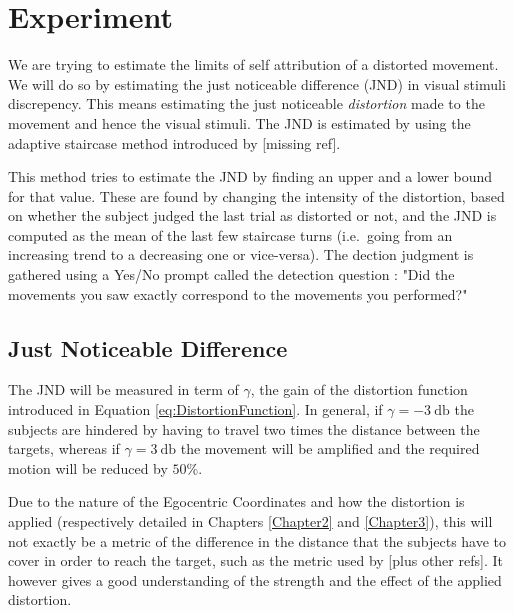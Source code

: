 
\chapter{Experiment} %

\label{Chapter4} %

We are trying to estimate the limits of self attribution of a distorted movement. We will do so by estimating the just noticeable difference (JND) in visual stimuli discrepency. This means estimating the just noticeable \textit{distortion} made to the movement and hence the visual stimuli. The JND is estimated by using the adaptive staircase method introduced by [missing ref].

This method tries to estimate the JND by finding an upper and a lower bound for that value. These are found by changing the intensity of the distortion, based on whether the subject judged the last trial as distorted or not, and the JND is computed as the mean of the last few staircase turns (i.e.\ going from an increasing trend to a decreasing one or vice-versa). The dection judgment is gathered using a Yes/No prompt called the detection question : "Did the movements you saw exactly correspond to the movements you performed?"

\section{Just Noticeable Difference}

The JND will be measured in term of $\gamma$, the gain of the distortion function introduced in Equation \ref{eq:DistortionFunction}. In general, if $\gamma = \SI{-3}{\decibel}$ the subjects are hindered by having to travel two times the distance between the targets, whereas if $\gamma = \SI{3}{\decibel}$ the movement will be amplified and the required motion will be reduced by $50\%$.

Due to the nature of the Egocentric Coordinates and how the distortion is applied (respectively detailed in Chapters \ref{Chapter2} and \ref{Chapter3}), this will not exactly be a metric of the difference in the distance that the subjects have to cover in order to reach the target, such as the metric used by \cite{debarba2017embodiment} [plus other refs]. It however gives a good understanding of the strength and the effect of the applied distortion.

